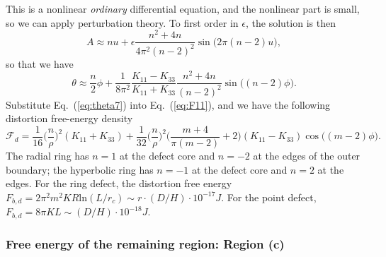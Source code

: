 \documentclass[nottitlepage]{article}
\begin{document}
       This is a nonlinear {\it ordinary} differential equation, and the nonlinear part is small, so we can apply perturbation theory. To first order in $\epsilon$, the solution is then
       \begin{equation}\label{eq:A2}
       A\approx nu+\epsilon\frac{n^2+4n}{4\pi^2(n-2)^2}\sin\bigg(2\pi(n-2)u\bigg),
       \end{equation}
       so that we have
       \begin{equation}\label{eq:theta7}
              \theta\approx\frac{n}{2}\phi+\frac{1}{8\pi^2}\frac{K_{11}-K_{33}}{K_{11}+K_{33}}\frac{n^2+4n}{(n-2)^2}\sin\bigg((n-2)\phi\bigg).
       \end{equation}
Substitute Eq.~(\ref{eq:theta7}) into Eq.~(\ref{eq:F11}), and we have the following distortion free-energy density
       \begin{equation}\label{eq:F12}
       \mathcal{F}_d=\frac{1}{16}\bigg(\frac{n}{\rho}\bigg)^2(K_{11}+K_{33})+\frac{1}{32}\bigg(\frac{n}{\rho}\bigg)^2\bigg(\frac{m+4}{\pi(m-2)}+2\bigg)(K_{11}-K_{33})\cos\bigg((m-2)\phi\bigg).
       \end{equation}
       The radial ring has $n=1$ at the defect core and $n=-2$ at the edges of the outer boundary; the hyperbolic ring has $n=-1$ at the defect core and $n=2$ at the edges. %
For the ring defect, the distortion free energy  $F_{b,d}=2\pi^2m^2 KR\mathrm{ln}(L/r_c)\sim r\cdot(D/H)\cdot 10^{-17}J$. For the point defect, $F_{b,d}=8\pi KL\sim (D/H)\cdot 10^{-18}J$. 

       \subsubsection {Free energy of the remaining region: Region (c)}
     
         
         

\end{document}
